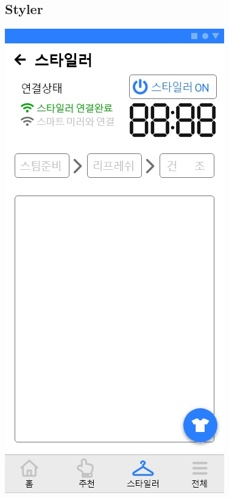 \documentclass[conference]{IEEEtran}
\begin{document}
\subsection{Styler \\ }
\centerline{\includegraphics[scale=0.32]{11. 스타일러.jpg}}
\end{document}
